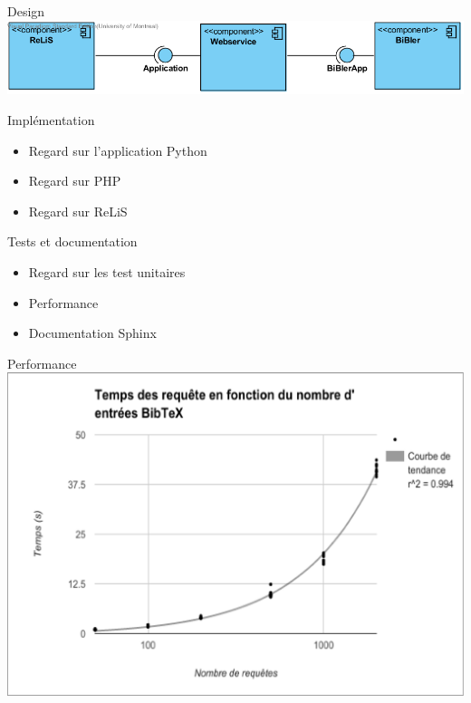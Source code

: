 \documentclass{beamer}
\begin{document}
\begin{frame}{Design}
\includegraphics[width=\linewidth,height=\textheight,keepaspectratio]{ComponentDiagram.png}
\end{frame}
\begin{frame}{Implémentation}

\begin{itemize}
  \item Regard sur l'application Python
  \item Regard sur PHP
  \item Regard sur ReLiS
\end{itemize}
\end{frame}
\begin{frame}{Tests et documentation}

\begin{itemize}
  \item Regard sur les test unitaires
  \item Performance
  \item Documentation Sphinx
\end{itemize}

\end{frame}
\begin{frame}{Performance}
\includegraphics[width=\linewidth,height=\textheight,keepaspectratio]{tempsparrequete.pdf}
\end{frame}
\end{document}
